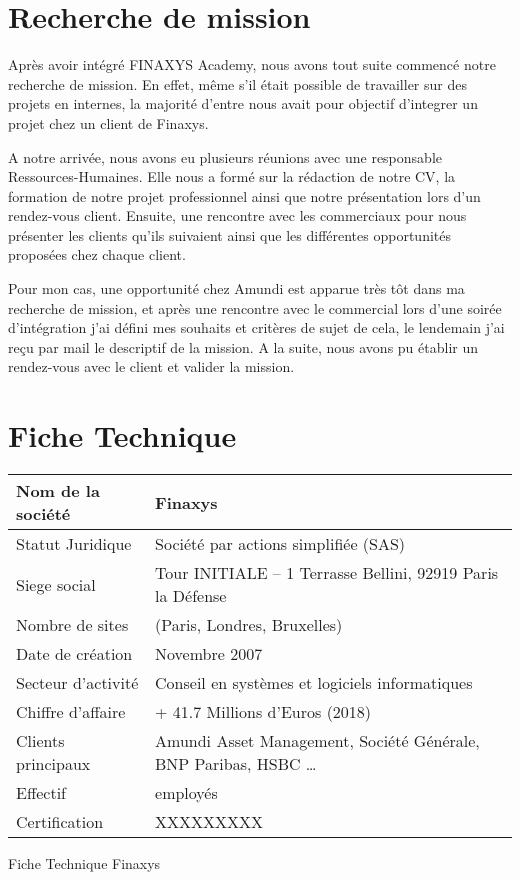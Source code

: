\section{Recherche de mission}
\par Après avoir intégré FINAXYS Academy, nous avons tout suite commencé notre recherche de mission. En effet, même s’il était possible de travailler sur des projets en internes, la majorité d’entre nous avait pour objectif d’integrer un projet chez un client de Finaxys.
\par A notre arrivée, nous avons eu plusieurs réunions avec une responsable Ressources-Humaines. Elle nous a formé sur la rédaction de notre CV, la formation de notre projet professionnel ainsi que notre présentation lors d’un rendez-vous client. Ensuite, une rencontre avec les commerciaux pour nous présenter les clients qu’ils suivaient ainsi que les différentes opportunités proposées chez chaque client.
\par Pour mon cas, une opportunité chez Amundi est apparue très tôt dans ma recherche de mission, et après une rencontre avec le commercial lors d’une soirée d’intégration j’ai défini mes souhaits et critères de sujet de cela, le lendemain j’ai reçu par mail le descriptif de la mission. A la suite, nous avons pu établir un rendez-vous avec le client et valider la mission.

\section{Fiche Technique}
\def\arraystretch{1.7}
\begin{center}
    \begin{tabularx}{0.9\textwidth} { 
        | >{\raggedright\arraybackslash}X
        | >{\centering\arraybackslash}X | }
    \hline
    Nom de la société   &   Finaxys \\
    \hline
    Statut Juridique    &   Société par actions simplifiée (SAS) \\
    \hline
    Siege social        &   Tour INITIALE – 1 Terrasse Bellini,  92919 Paris la Défense  \\
    \hline
    Nombre de sites     &   3 (Paris, Londres, Bruxelles) \\
    \hline
    Date de création    &   Novembre 2007  \\
    \hline
    Secteur d’activité  &   Conseil en systèmes et logiciels informatiques  \\
    \hline
    Chiffre d’affaire   &   + 41.7 Millions d'Euros (2018)  \\
    \hline
    Clients principaux  &   Amundi Asset Management, Société Générale, BNP Paribas, HSBC \dots  \\
    \hline
    Effectif            &   350 employés\\
    \hline
    Certification       &   XXXXXXXXX  \\
    \hline
    \end{tabularx}
    \begin{table}[htp]
        \caption{Fiche Technique Finaxys}
    \end{table}
\end{center}

